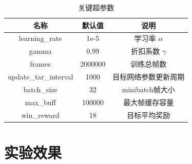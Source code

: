 \documentclass[a4paper,12pt]{article}
\begin{document}
\begin{CJK}{UTF8}{gbsn}
\begin{table}[!h]
	\renewcommand{\arraystretch}{1.1}
	\caption{关键超参数}
	\centering
	\begin{tabular}{ccc}
		\hline
		名称& 默认值& 说明\\
		\hline
		learning\_rate& 1e-5 & 学习率 $\alpha$\\
		gamma& 0.99 & 折扣系数 $\gamma$\\
		frames& 2000000 & 训练总帧数\\
		update\_tar\_interval& 1000 & 目标网络参数更新周期 \\
		batch\_size& 32 & minibatch帧大小\\
		max\_buff& 100000 & 最大帧缓存容量 \\
		win\_reward& 18 & 目标平均奖励 \\
		\hline
	\end{tabular}
\end{table}
\section{实验效果}

\end{CJK}
\end{document}
